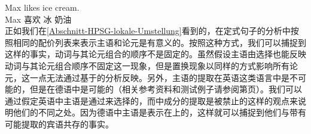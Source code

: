 \ea
\gll Max likes ice cream.\\
Max 喜欢 冰 奶油\\
\z
正如我们在\ref{Abschnitt-HPSG-lokale-Umstellung}看到的，在定式句子的分析中按照相同的配价列表来表示主语和论元是有意义的。按照这种方式，我们可以捕捉到这样的事实，动词与其论元组合的顺序不是固定的。虽然假设主语由\sprc 选择也能反映动词与其论元组合顺序不固定这一现象，但是置换现象以同样的方式影响所有论元，这一点无法通过基于\sprc 的分析反映。另外，主语的提取在英语这类语言中是不可能的，但是在德语中是可能的（相关参考资料和测试例子请参阅第\pageref{page-extraction-out-of-subjects}页）。我们可以通过假定英语中主语是通过\sprc 来选择的，而\sprlc 中成分的提取是被禁止的这样的观点来说明他们的不同之处。因为德语中主语是表示在\compslc 上的，这样就可以捕捉到他们与带有可能提取的宾语共存的事实。

